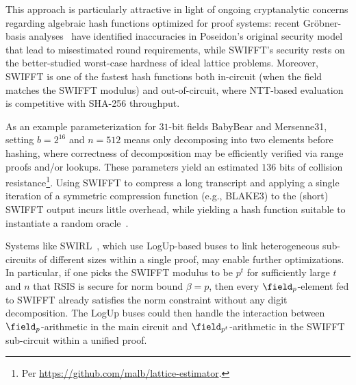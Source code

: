 This approach is particularly attractive in light of ongoing cryptanalytic concerns regarding algebraic hash functions optimized for proof systems: recent Gröbner-basis analyses~\cite{EPRINT:GraKosRec25,ToSC:BBLP22} have identified inaccuracies in Poseidon's original security model that lead to misestimated round requirements, while SWIFFT's security rests on the better-studied worst-case hardness of ideal lattice problems. Moreover, SWIFFT is one of the fastest hash functions both in-circuit (when the field matches the SWIFFT modulus) and out-of-circuit, where NTT-based evaluation is competitive with SHA-256 throughput.

As an example parameterization for $31$-bit fields BabyBear and Mersenne31, setting $b=2^{16}$ and $n=512$ means only decomposing into two elements before hashing, where correctness of decomposition may be efficiently verified via range proofs and/or lookups. These parameters yield an estimated $136$ bits of collision resistance\footnote{Per \url{https://github.com/malb/lattice-estimator}.}. Using SWIFFT to compress a long transcript and applying a single iteration of a symmetric compression function (e.g., BLAKE3) to the (short) SWIFFT output incurs little overhead, while yielding a hash function suitable to instantiate a random oracle~\cite{FC:VGSGJK22}.

Systems like SWIRL~\cite{swirl}, which use LogUp-based buses to link heterogeneous sub-circuits of different sizes within a single proof, may enable further optimizations. In particular, if one picks the SWIFFT modulus to be $p^t$ for sufficiently large $t$ and $n$ that RSIS is secure for norm bound $\beta = p$, then every $\field_p$-element fed to SWIFFT already satisfies the norm constraint without any digit decomposition. The LogUp buses could then handle the interaction between $\field_p$-arithmetic in the main circuit and $\field_{p^t}$-arithmetic in the SWIFFT sub-circuit within a unified proof.